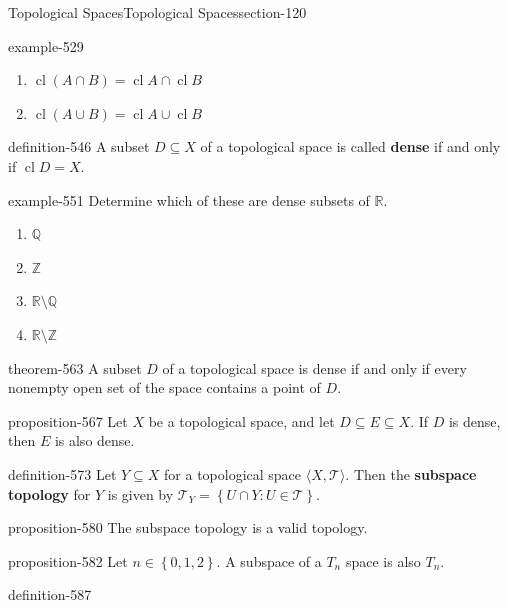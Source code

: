 \documentclass[oneside,10pt,]{article}
\newcommand{\terminology}[1]{\textbf{#1}}
\newcommand{\tuple}[1]{\langle #1 \rangle}
\newcommand{\mb}{\mathbb}
\newcommand{\mc}{\mathcal}
\newcommand{\cl}{\operatorname{cl}}
\newcommand{\setBuilder}[2]{\left\{#1:#2\right\}}
\newcommand{\setList}[1]{\left\{#1\right\}}
\begin{document}
\begin{sectionptx}{Topological Spaces}{}{Topological Spaces}{}{}{section-120}
\begin{example}{}{example-529}
\begin{enumerate}
\item\hypertarget{li-542}{}\(\cl(A\cap B)=\cl A\cap\cl B\)%
\item\hypertarget{li-544}{}\(\cl(A\cup B)=\cl A\cup\cl B\)%
\end{enumerate}
\end{example}
\begin{definition}{}{definition-546}%
\hypertarget{p-547}{}%
A subset \(D\subseteq X\) of a topological space is called \terminology{dense} if and only if \(\cl D=X\).%
\end{definition}
\begin{example}{}{example-551}%
\hypertarget{p-552}{}%
Determine which of these are dense subsets of \(\mb R\).%
\leavevmode%
\begin{enumerate}
\item\hypertarget{li-555}{}\(\mb Q\)%
\item\hypertarget{li-557}{}\(\mb Z\)%
\item\hypertarget{li-559}{}\(\mb R\setminus\mb Q\)%
\item\hypertarget{li-561}{}\(\mb R\setminus\mb Z\)%
\end{enumerate}
\end{example}
\begin{theorem}{}{}{theorem-563}%
\hypertarget{p-564}{}%
A subset \(D\) of a topological space is dense if and only if every nonempty open set of the space contains a point of \(D\).%
\end{theorem}
\begin{proposition}{}{}{proposition-567}%
\hypertarget{p-568}{}%
Let \(X\) be a topological space, and let \(D\subseteq E\subseteq X\). If \(D\) is dense, then \(E\) is also dense.%
\end{proposition}
\begin{definition}{}{definition-573}%
\hypertarget{p-574}{}%
Let \(Y\subseteq X\) for a topological space \(\tuple{X,\mc T}\). Then the \terminology{subspace topology} for \(Y\) is given by \(\mc T_Y=\setBuilder{U\cap Y}{U\in\mc T}\).%
\end{definition}
\begin{proposition}{}{}{proposition-580}%
\hypertarget{p-581}{}%
The subspace topology is a valid topology.%
\end{proposition}
\begin{proposition}{}{}{proposition-582}%
\hypertarget{p-583}{}%
Let \(n\in\setList{0,1,2}\). A subspace of a \(T_n\) space is also \(T_n\).%
\end{proposition}
\begin{definition}{}{definition-587}%

\end{definition}
\end{sectionptx}
\end{document}
